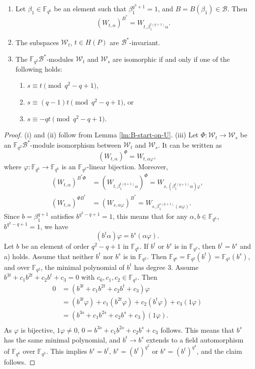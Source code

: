 \documentclass[entropy,article,submit,pdftex,moreauthors]{Definitions/mdpi}
\begin{document}
\begin{Proposition}
\begin{enumerate}[label=(\roman*)]
\item Let $\beta_1 \in \mathbb{F}_{q^6}$ be an element such that $\beta_1^{q^3+1}=1$, and $B=B(\beta_1) \in \mathcal{B}$. Then
\[(W_{t,\alpha})^{B^*} = W_{t,\beta_1^{t(q+1)}\alpha}.\]
\item The subspaces $\mathcal{W}_t$, $t\in H(P)$ are $\mathcal{B}^*$-invariant. 
\item The $\mathbb{F}_{q^2}\mathcal{B}^*$-modules $\mathcal{W}_t$ and $\mathcal{W}_s$ are isomorphic if and only if one of the following holds:
\begin{enumerate}[label=\alph*)]
\item $s\equiv t \pmod{q^2-q+1}$, 
\item $s\equiv (q-1)t \pmod{q^2-q+1}$, or 
\item $s\equiv -qt \pmod{q^2-q+1}$. 
\end{enumerate}
\end{enumerate}
\end{Proposition}
\begin{proof}
(i) and (ii) follow from Lemma \ref{lm:B-start-on-U}. (iii) Let $\Phi:\mathcal{W}_t \to \mathcal{W}_s$ be an $\mathbb{F}_{q^2}\mathcal{B}^*$-module isomorphism between $\mathcal{W}_t$ and $\mathcal{W}_s$. It can be written as
\[(W_{t,\alpha})^\Phi = W_{t,\alpha \varphi},\]
where $\varphi:\mathbb{F}_{q^6}\to \mathbb{F}_{q^6}$ is an $\mathbb{F}_{q^2}$-linear bijection. Moreover,
\begin{align*}
(W_{t,\alpha})^{B^*\Phi} & = (W_{t,\beta_1^{t(q+1)} \alpha})^\Phi = W_{s,(\beta_1^{t(q+1)}\alpha)\varphi}, \\
(W_{t,\alpha})^{\Phi B^*} & = (W_{s,\alpha\varphi})^{B^*} = W_{s,\beta_1^{s(q+1)}(\alpha\varphi)}.
\end{align*}
Since $b=\beta_1^{q+1}$ satisfies $b^{q^2-q+1}=1$, this means that for any $\alpha, b\in \mathbb{F}_{q^6}$, $b^{q^2-q+1}=1$, we have
\[(b^t \alpha) \varphi = b^s(\alpha\varphi).\]
Let $b$ be an element of order $q^2-q+1$ in $\mathbb{F}_{q^6}$. If $b^t$ or $b^s$ is in $\mathbb{F}_{q^2}$, then $b^t=b^s$ and a) holds. Assume that neither $b^t$ nor $b^s$ is in $\mathbb{F}_{q^2}$. Then $\mathbb{F}_{q^6}=\mathbb{F}_{q^2}(b^t)=\mathbb{F}_{q^2}(b^s)$, and over $\mathbb{F}_{q^2}$, the minimal polynomial of $b^t$ has degree $3$. Assume $b^{3t}+c_1b^{2t}+c_2b^t+c_3=0$ with $c_0,c_1,c_2\in \mathbb{F}_{q^2}$. Then
\begin{align*}
0&=(b^{3t}+c_1b^{2t}+c_2b^t+c_3)\varphi \\
&= (b^{3t}\varphi)+c_1(b^{2t}\varphi)+c_2(b^t\varphi)+c_3(1\varphi) \\
&= (b^{3s}+c_1b^{2s}+c_2b^s+c_3)(1\varphi). \\
\end{align*}
As $\varphi$ is bijective, $1\varphi\neq 0$, $0=b^{3s}+c_1b^{2s}+c_2b^s+c_3$ follows. This means that $b^s$ has the same minimal polynomial, and $b^t \to b^s$ extends to a field automorphism of $\mathbb{F}_{q^6}$ over $\mathbb{F}_{q^2}$. This implies $b^s=b^t$, $b^s=(b^t)^{q^2}$ or $b^s=(b^t)^{q^4}$, and the claim follows. 
\end{proof}
\end{document}

